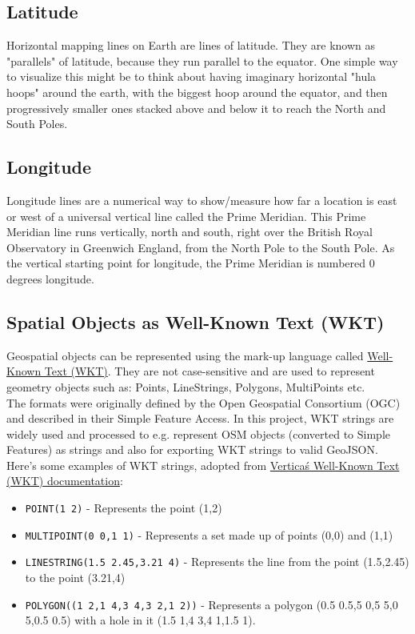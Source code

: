 \subsection{Latitude}
Horizontal mapping lines on Earth are lines of latitude.
They are known as "parallels" of latitude, because they run parallel to the equator.
One simple way to visualize this might be to think about having imaginary horizontal "hula hoops" around the earth,
with the biggest hoop around the equator, and then progressively smaller ones stacked above and
below it to reach the North and South Poles. \cite{JourneyNorthLatitudeLongitude}
\subsection{Longitude}
Longitude lines are a numerical way to show/measure how far a location is east or west of a universal vertical line called the
Prime Meridian.
This Prime Meridian line runs vertically, north and south, right over the British Royal Observatory in
Greenwich England, from the North Pole to the South Pole.
As the vertical starting point for longitude, the Prime Meridian is numbered 0 degrees longitude. \cite{JourneyNorthLatitudeLongitude}
\subsection{Spatial Objects as Well-Known Text (WKT)}
Geospatial objects can be represented using the mark-up language called \href{https://www.ogc.org/standards/wkt-crs}{Well-Known Text (WKT)}.
They are not case-sensitive and are used to represent geometry objects such as: Points, LineStrings, Polygons, MultiPoints etc.\\
\newline
The formats were originally defined by the Open Geospatial Consortium (OGC) and described in their Simple Feature Access.
In this project, WKT strings are widely used and processed to e.g. represent OSM objects (converted to Simple Features) as strings and also for exporting
WKT strings to valid GeoJSON. \cite{OGCWKT}\\
\newline
Here's some examples of WKT strings, adopted from \href{https://www.vertica.com/docs/9.3.x/HTML/Content/Authoring/AnalyzingData/Geospatial/Spatial_Definitions/WellknownTextWKT.htm}{Vertica\'s Well-Known Text (WKT) documentation}: \cite{VerticaWKT}
\begin{itemize}
    \item \texttt{POINT(1 2)} - Represents the point (1,2)
    \item \texttt{MULTIPOINT(0 0,1 1)} - Represents a set made up of points (0,0) and (1,1)
    \item \texttt{LINESTRING(1.5 2.45,3.21 4)} - Represents the line from the point (1.5,2.45) to the point (3.21,4)
    \item \texttt{POLYGON((1 2,1 4,3 4,3 2,1 2))} - Represents a polygon (0.5 0.5,5 0,5 5,0 5,0.5 0.5) with a hole in it (1.5 1,4 3,4 1,1.5 1).
\end{itemize}

